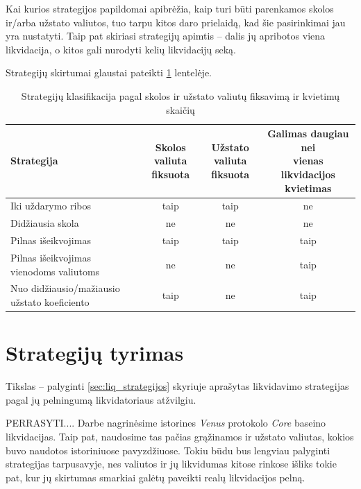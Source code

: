 \documentclass[]{VUMIFTemplateClass}
\begin{document}
Kai kurios strategijos papildomai apibrėžia, kaip turi būti parenkamos skolos ir/arba užstato valiutos, tuo tarpu kitos daro prielaidą, kad šie pasirinkimai jau yra nustatyti. Taip pat skiriasi strategijų apimtis – dalis jų apribotos viena likvidacija, o kitos gali nurodyti kelių likvidacijų seką.

Strategijų skirtumai glaustai pateikti \ref{tab:strategiju_klasifikacija} lentelėje.

\begin{table}[H]
    \centering
    \caption{Strategijų klasifikacija pagal skolos ir užstato valiutų fiksavimą ir kvietimų skaičių}
    \begin{tabular}{|>{\raggedright\arraybackslash}p{5.5cm}|c|c|c|}
      \hline
      \textbf{Strategija} & \makecell{\textbf{Skolos valiuta} \\ \textbf{fiksuota}} & \makecell{\textbf{Užstato valiuta} \\ \textbf{fiksuota}} & \makecell{\textbf{Galimas daugiau nei} \\ \textbf{vienas likvidacijos kvietimas}} \\
      \hline
      Iki uždarymo ribos & taip & taip & ne \\
      \hline
      Didžiausia skola   & ne & ne & ne \\
      \hline
      Pilnas išeikvojimas  & taip & taip & taip \\
      \hline
      Pilnas išeikvojimas vienodoms valiutoms  & ne & ne & taip \\
      \hline
      Nuo didžiausio/mažiausio užstato koeficiento & taip & ne & taip \\
      \hline
    \end{tabular}
    \label{tab:strategiju_klasifikacija}
\end{table}
  

\section{Strategijų tyrimas}
Tikslas – palyginti \ref{sec:liq_strategijos} skyriuje aprašytas likvidavimo strategijas pagal jų pelningumą likvidatoriaus atžvilgiu.

PERRASYTI....
Darbe nagrinėsime istorines \textit{\textit{Venus}} protokolo \textit{Core} baseino likvidacijas. Taip pat, naudosime tas pačias grąžinamos ir užstato valiutas, kokios buvo naudotos istoriniuose pavyzdžiuose. Tokiu būdu bus lengviau palyginti strategijas tarpusavyje, nes valiutos ir jų likvidumas kitose rinkose išliks tokie pat, kur jų skirtumas smarkiai galėtų paveikti realų likvidacijos pelną.
\end{document}
